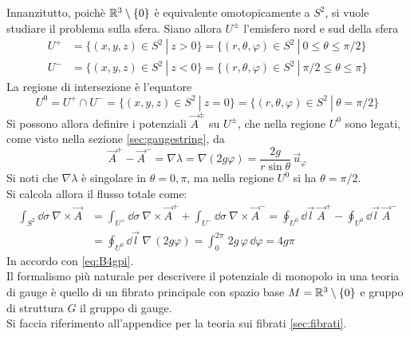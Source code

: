 Innanzitutto, poichè $\mathbb{R}^3 \setminus \{0\}$ è equivalente omotopicamente
a $S^2$, si vuole studiare il problema sulla sfera. Siano allora $U^\pm$ l'emisfero
nord e sud della sfera
\begin{equation}\label{eq:U+U-}
   \begin{aligned}
      U^+ &= \{(x,y,z) \in S^2 \: | \: z > 0 \}
          = \{(r,\theta,\varphi ) \in S^2 \: | \: 0 \leq \theta \leq \pi/2 \} \\
      U^- &= \{(x,y,z) \in S^2 \: | \: z < 0 \}
          = \{(r,\theta,\varphi ) \in S^2 \: | \: \pi/2 \leq \theta \leq \pi \}
   \end{aligned}
\end{equation}
La regione di intersezione è l'equatore
\begin{equation*}
   U^0 = U^+ \cap U^- = \{(x,y,z) \in S^2 \: | \: z = 0 \}
       = \{(r,\theta,\varphi ) \in S^2 \: | \: \theta = \pi/2 \}
\end{equation*}
Si possono allora definire i potenziali $\vec A^\pm$ su $U^\pm$, che nella regione
$U^0$ sono legati, come visto nella sezione \ref{sec:gaugestring}, da
$$
   \vec A ^+ - \vec A^- = \nabla \lambda = \nabla (2g\varphi ) = \frac{2g}{r\sin\theta} \, \vec u _\varphi
$$
Si noti che $\nabla \lambda$ è singolare in $\theta = 0,\pi$, ma nella regione $U^0$
si ha $\theta = \pi/2$.\\
Si calcola allora il flusso totale come:
\begin{equation*}
   \begin{aligned}
      \int_{S^2} \dd \sigma \: \nabla \times \vec A & =
         \int_{U^+} \dd \sigma \: \nabla \times \vec A^+ +
         \int_{U^-} \dd \sigma \: \nabla \times \vec A^-
        = \oint_{U^0} \dd \vec l \: \vec A^+ -
          \oint_{U^0} \dd \vec l \: \vec A^- \\
      & = \oint_{U^0} \dd \vec l \: \nabla \, (2g\varphi )
        = \int_0^{2\pi} \, 2g \, \varphi  \, \dd \varphi
        = 4g\pi
   \end{aligned}
\end{equation*}
In accordo con \ref{eq:B4gpi}.\\

Il formalismo più naturale per descrivere il potenziale di monopolo in una teoria
di gauge è quello di un fibrato principale con spazio base $M = \mathbb{R}^3
\setminus \{0\}$ e gruppo di struttura $G$ il gruppo di gauge.\\
Si faccia riferimento all'appendice per la teoria sui fibrati \ref{sec:fibrati}.

